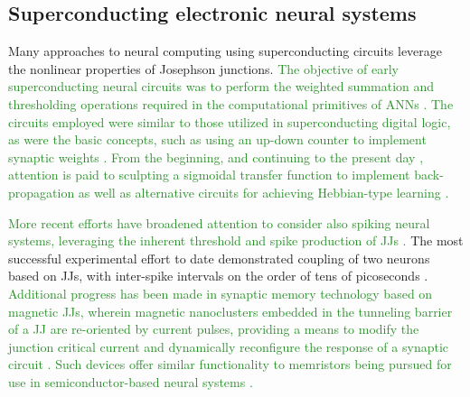 \documentclass[twocolumn]{article}
\begin{document}
\subsection{Superconducting electronic neural systems}
Many approaches to neural computing using superconducting circuits leverage the nonlinear properties of Josephson junctions. \textcolor{ForestGreen}{The objective of early superconducting neural circuits was to perform the weighted summation and thresholding operations required in the computational primitives of ANNs \cite{hago1991,hiak1991}. The circuits employed were similar to those utilized in superconducting digital logic, as were the basic concepts, such as using an up-down counter to implement synaptic weights \cite{hiak1991}. From the beginning, and continuing to the present day \cite{sckl2016,klsc2018,sosc2018}, attention is paid to sculpting a sigmoidal transfer function to implement back-propagation as well as alternative circuits for achieving Hebbian-type learning \cite{hago1991}.} 

\textcolor{ForestGreen}{More recent efforts have broadened attention to consider also spiking neural systems, leveraging the inherent threshold and spike production of JJs \cite{crsc2010,scdo2018}.}  The most successful experimental effort to date demonstrated coupling of two neurons based on JJs, with inter-spike intervals on the order of tens of picoseconds \cite{sele2017}. \textcolor{ForestGreen}{Additional progress has been made in synaptic memory technology based on magnetic JJs, wherein magnetic nanoclusters embedded in the tunneling barrier of a JJ are re-oriented by current pulses, providing a means to modify the junction critical current and dynamically reconfigure the response of a synaptic circuit \cite{scdo2018}. Such devices offer similar functionality to memristors being pursued for use in semiconductor-based neural systems \cite{kiha2018}.} 
\end{document}
